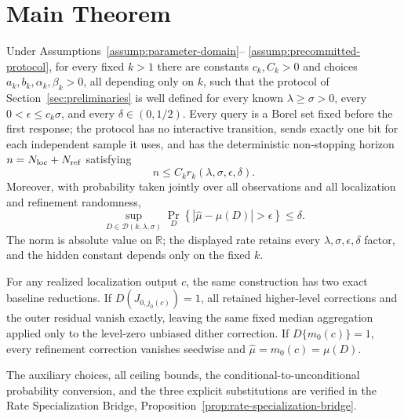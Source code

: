 \section{Main Theorem}

\begin{theorem}
\label{thm:main}
Under Assumptions~\ref{assump:parameter-domain}--
\ref{assump:precommitted-protocol}, for every fixed $k>1$ there are constants
$c_k,C_k>0$ and choices $a_k,b_k,\alpha_k,\beta_k>0$, all depending only on
$k$, such that the protocol of Section~\ref{sec:preliminaries} is well defined
for every known $\lambda\geq\sigma>0$, every
$0<\epsilon\leq c_k\sigma$, and every $\delta\in(0,1/2)$.  Every query is a
Borel set fixed before the first response; the protocol has no interactive
transition, sends exactly one bit for each independent sample it uses, and has
the deterministic non-stopping horizon $n=N_{\rm loc}+N_{\rm ref}$ satisfying
\[
 n\leq C_k r_k(\lambda,\sigma,\epsilon,\delta).
\]
Moreover, with probability taken jointly over all observations and all
localization and refinement randomness,
\[
 \sup_{D\in\mathcal D(k,\lambda,\sigma)}
 \Pr_D\left\{|\widehat\mu-\mu(D)|>\epsilon\right\}\leq\delta.
\]
The norm is absolute value on $\mathbb R$; the displayed rate retains every
$\lambda,\sigma,\epsilon,\delta$ factor, and the hidden constant depends only
on the fixed $k$.

For any realized localization output $c$, the same construction has two exact
baseline reductions.  If $D(J_{0,j_0(c)})=1$, all retained higher-level
corrections and the outer residual vanish exactly, leaving the same fixed
median aggregation applied only to the level-zero unbiased dither correction.
If $D\{m_0(c)\}=1$, every refinement correction vanishes seedwise and
$\widehat\mu=m_0(c)=\mu(D)$.
\end{theorem}

The auxiliary choices, all ceiling bounds, the conditional-to-unconditional
probability conversion, and the three explicit substitutions are verified in
the Rate Specialization Bridge, Proposition~\ref{prop:rate-specialization-bridge}.
